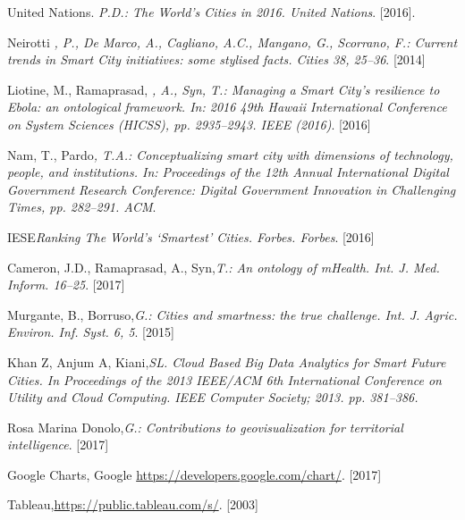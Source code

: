 \documentclass[french, a4paper, 12pt]{report}
\begin{document}
% 
%  
{} 
\begin{thebibliography}{9}
United Nations. \emph{P.D.: The World’s Cities in 2016. United Nations}. [2016].

 Neirotti \emph{, P., De Marco, A., Cagliano, A.C., Mangano, G., Scorrano, F.: Current trends in Smart City initiatives: some stylised facts. Cities 38, 25–36}. [2014]


  Liotine, M., Ramaprasad, \emph{, A., Syn, T.: Managing a Smart City’s resilience to Ebola: an ontological framework. In: 2016 49th Hawaii International Conference on System Sciences (HICSS), pp. 2935–2943. IEEE (2016)}. [2016]

 Nam, T., Pardo\emph{, T.A.: Conceptualizing smart city with dimensions of technology, people, and institutions. In: Proceedings of the 12th Annual International Digital Government Research Conference: Digital Government Innovation in Challenging Times, pp. 282–291. ACM}.

IESE\emph{Ranking The World’s ‘Smartest’ Cities. Forbes. Forbes}. [2016]

Cameron, J.D., Ramaprasad, A., Syn,\emph{T.: An ontology of mHealth. Int. J. Med. Inform. 16–25}. [2017]

 Murgante, B., Borruso,\emph{G.: Cities and smartness: the true challenge. Int. J. Agric. Environ. Inf. Syst. 6, 5}. [2015]

Khan Z, Anjum A, Kiani,\emph{SL. Cloud Based Big Data Analytics for Smart Future Cities. In Proceedings of the 2013 IEEE/ACM 6th International Conference on Utility and Cloud Computing. IEEE Computer Society; 2013. pp. 381–386.}

 Rosa Marina Donolo,\emph{G.: Contributions to geovisualization for territorial
intelligence}. [2017]

 Google Charts, Google \url{https://developers.google.com/chart/}. [2017]

 Tableau,\url{https://public.tableau.com/s/}. [2003]

\end{thebibliography}
\end{document}

